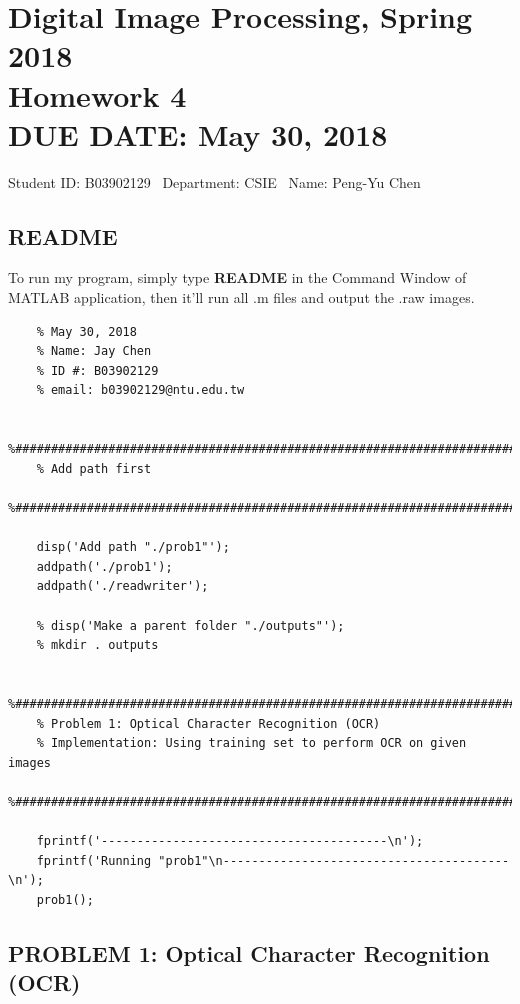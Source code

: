 \documentclass{article}
\newcommand{\hmwkClass}{Digital Image Processing, Spring 2018}
\newcommand{\hmwkTitle}{Homework 4}
\newcommand{\hmwkDueDate}{May 30, 2018}
\newcommand{\tb}{\textbf}
\begin{document}
\thispagestyle{empty}
\section*{\hmwkClass \\
    \normalsize{\hmwkTitle} \\
    \normalsize{DUE DATE: \hmwkDueDate}
}

\hfill{Student ID: B03902129 \, Department: CSIE \, Name: Peng-Yu Chen}

\subsection*{README}

To run my program, simply type \tb{README} in the Command Window of MATLAB application, then it'll run all .m files and output the .raw images.

\begin{lstlisting}[caption = {README.m}]
    % DIP Homework Assignment #4
    % May 30, 2018
    % Name: Jay Chen
    % ID #: B03902129 
    % email: b03902129@ntu.edu.tw
    
    %#########################################################################
    % Add path first
    %#########################################################################
    
    disp('Add path "./prob1"');
    addpath('./prob1');
    addpath('./readwriter');
    
    % disp('Make a parent folder "./outputs"');
    % mkdir . outputs
    
    %######################################################################### 
    % Problem 1: Optical Character Recognition (OCR)                                           
    % Implementation: Using training set to perform OCR on given images
    %#########################################################################
    
    fprintf('----------------------------------------\n');
    fprintf('Running "prob1"\n----------------------------------------\n');
    prob1();    
\end{lstlisting}

\newpage
\subsection*{PROBLEM 1: Optical Character Recognition (OCR)}
\end{document}
